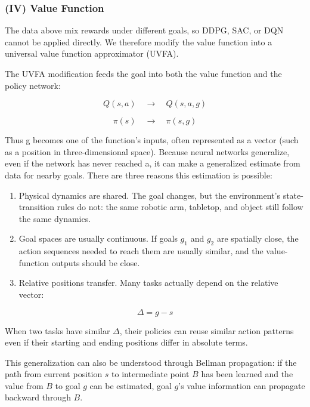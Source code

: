 \hypertarget{iv-value-function}{%
\subsubsection{(IV) Value Function}\label{iv-value-function}}

The data above mix rewards under different goals, so DDPG, SAC, or DQN cannot be applied directly. We therefore modify the value function into a universal value function approximator (UVFA).

The UVFA modification feeds the goal into both the value function and the policy network:

\[
Q(s,a)\quad\longrightarrow\quad Q(s,a,g)
\]

\[
\pi(s)\quad\longrightarrow\quad \pi(s,g)
\]

Thus g becomes one of the function's inputs, often represented as a vector (such as a position in three-dimensional space). Because neural networks generalize, even if the network has never reached a, it can make a generalized estimate from data for nearby goals. There are three reasons this estimation is possible:

\begin{enumerate}
\def\labelenumi{\arabic{enumi}.}
\tightlist
\item
  Physical dynamics are shared. The goal changes, but the environment's state-transition rules do not: the same robotic arm, tabletop, and object still follow the same dynamics.
\item
  Goal spaces are usually continuous. If goals \(g_1\) and \(g_2\) are spatially close, the action sequences needed to reach them are usually similar, and the value-function outputs should be close.
\item
{}
  Relative positions transfer. Many tasks actually depend on the relative vector:
\end{enumerate}

\[
\Delta=g-s
\]

When two tasks have similar \(\Delta\), their policies can reuse similar action patterns even if their starting and ending positions differ in absolute terms.

This generalization can also be understood through Bellman propagation: if the path from current position \(s\) to intermediate point \(B\) has been learned and the value from \(B\) to goal \(g\) can be estimated, goal \(g\)'s value information can propagate backward through \(B\).

